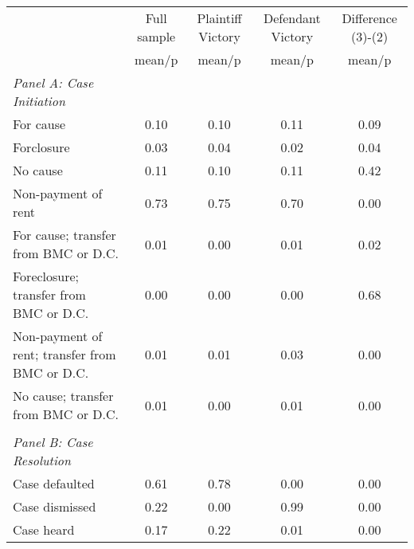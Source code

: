 {
\def\sym#1{\ifmmode^{#1}\else\(^{#1}\)\fi}
\begin{tabular}{l*{4}{c}}
\toprule
                    &\multicolumn{1}{c}{Full sample}&\multicolumn{1}{c}{Plaintiff Victory}&\multicolumn{1}{c}{Defendant Victory}&\multicolumn{1}{c}{Difference (3)-(2)}\\
                    &      mean/p&      mean/p&      mean/p&      mean/p\\
\midrule
\emph{Panel A: Case Initiation}&            &            &            &            \\
\hspace{0.25cm}For cause&       0.10 &       0.10 &       0.11 &        0.09\\
\hspace{0.25cm}Forclosure&       0.03 &       0.04 &       0.02 &        0.04\\
\hspace{0.25cm}No cause&       0.11 &       0.10 &       0.11 &        0.42\\
\hspace{0.25cm}Non-payment of rent&       0.73 &       0.75 &       0.70 &        0.00\\
\hspace{0.25cm}For cause; transfer from BMC or D.C.&       0.01 &       0.00 &       0.01 &        0.02\\
\hspace{0.25cm}Foreclosure; transfer from BMC or D.C.&       0.00 &       0.00 &       0.00 &        0.68\\
\hspace{0.25cm}Non-payment of rent; transfer from BMC or D.C.&       0.01 &       0.01 &       0.03 &        0.00\\
\hspace{0.25cm}No cause; transfer from BMC or D.C.&       0.01 &       0.00 &       0.01 &        0.00\\
\vspace{0.1em} \\ \emph{Panel B: Case Resolution}&            &            &            &            \\
\hspace{0.25cm}Case defaulted&       0.61 &       0.78 &       0.00 &        0.00\\
\hspace{0.25cm}Case dismissed&       0.22 &       0.00 &       0.99 &        0.00\\
\hspace{0.25cm}Case heard&       0.17 &       0.22 &       0.01 &        0.00\\

\end{tabular}}
